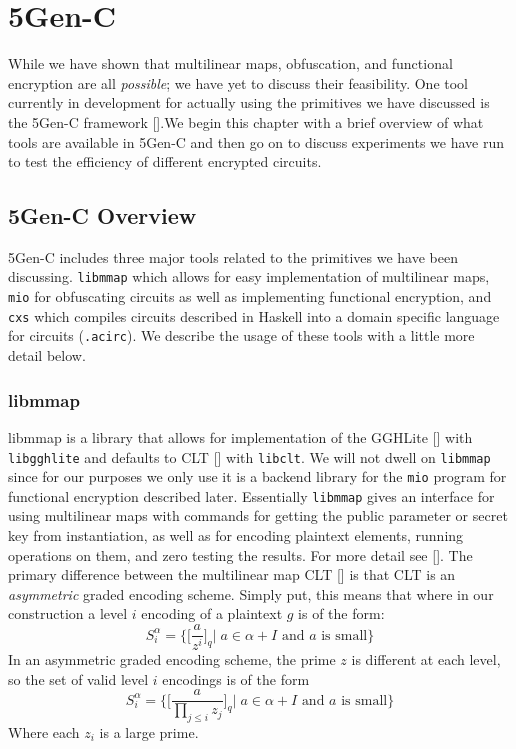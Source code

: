 \documentclass[12pt,twoside]{reedthesis}
\begin{document}
    
    
    
    
    \chapter{5Gen-C}
    \par While we have shown that multilinear maps, obfuscation, and functional encryption are all \textit{possible}; we have yet to discuss their feasibility. One tool currently in development for actually using the primitives we have discussed is the 5Gen-C framework [\cite{5genc}].We begin this chapter with a brief overview of what tools are available in 5Gen-C and then go on to discuss experiments we have run to test the efficiency of different encrypted circuits. 
    
      
    \section{5Gen-C Overview}
    5Gen-C includes three major tools related to the primitives we have been discussing. \texttt{libmmap} which allows for easy implementation of multilinear maps, \texttt{mio} for obfuscating circuits as well as implementing functional encryption, and \texttt{cxs} which compiles circuits described in Haskell into a domain specific language for circuits (\texttt{.acirc}). We describe the usage of these tools with a little more detail below.
    
    \subsection{libmmap}
    libmmap is a library that allows for implementation of the GGHLite [\cite{GGHLite}] with \texttt{libgghlite} and defaults to CLT [\cite{CLT13}] with \texttt{libclt}. We will not dwell on \texttt{libmmap} since for our purposes we only use it is a backend library for the \texttt{mio} program for functional encryption described later. Essentially \texttt{libmmap} gives an interface for using multilinear maps with commands for getting the public parameter or secret key from instantiation, as well as for encoding plaintext elements, running operations on them, and zero testing the results. For more detail see [\cite{5genc}]. The primary difference between the multilinear map CLT [\cite{CLT13}] is that CLT is an \textit{asymmetric} graded encoding scheme. Simply put, this means that where in our construction a level $i$ encoding of a plaintext $g$ is of the form:
    $$S_i^\alpha =\bigg\{\bigg[\frac{a}{z^i} \bigg]_q \bigg| \; a \in \alpha + I \text{ and $a$ is small}\bigg\} $$
    In an asymmetric graded encoding scheme, the prime $z$ is different at each level, so the set of valid level $i$ encodings is of the form
    $$S_i^\alpha =\bigg\{\bigg[\frac{a}{\prod_{j\leq i} z_j} \bigg]_q \bigg| \; a \in \alpha + I \text{ and $a$ is small}\bigg\} $$
      Where each $z_i$ is a large prime. 
\end{document}
